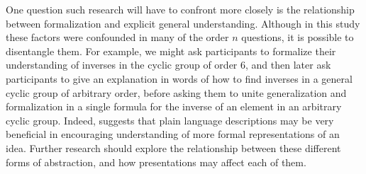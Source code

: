 \documentclass[man,mask,10pt]{apa6}
\begin{document}
One question such research will have to confront more closely is the relationship between formalization and explicit general understanding. Although in this study these factors were confounded in many of the order $n$ questions, it is possible to disentangle them. For example, we might ask participants to formalize their understanding of inverses in the cyclic group of order 6, and then later ask participants to give an explanation in words of how to find inverses in a general cyclic group of arbitrary order, before asking them to unite generalization and formalization in a single formula for the inverse of an element in an arbitrary cyclic group. Indeed,  suggests that plain language descriptions may be very beneficial in encouraging understanding of more formal representations of an idea. Further research should explore the relationship between these different forms of abstraction, and how presentations may affect each of them.
\end{document}
